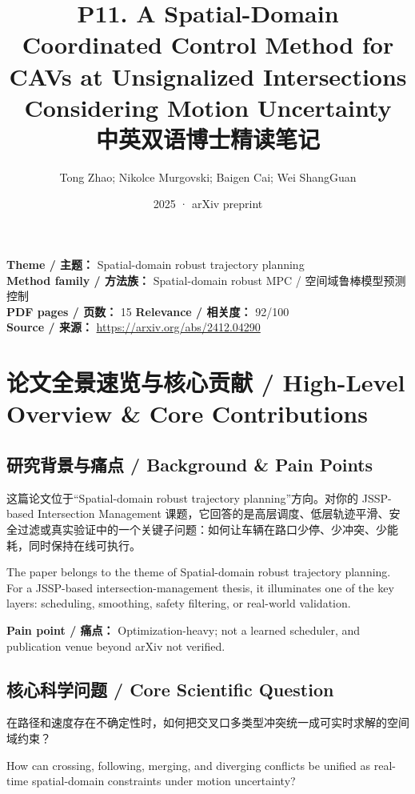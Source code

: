 \documentclass[UTF8,a4paper,11pt,fontset=fandol]{ctexart}
\title{P11. A Spatial-Domain Coordinated Control Method for CAVs at Unsignalized Intersections Considering Motion Uncertainty\\中英双语博士精读笔记}
\author{Tong Zhao; Nikolce Murgovski; Baigen Cai; Wei ShangGuan}
\date{2025 · arXiv preprint}
\begin{document}
\maketitle

\noindent\textbf{Theme / 主题：} Spatial-domain robust trajectory planning\\
\textbf{Method family / 方法族：} Spatial-domain robust MPC / 空间域鲁棒模型预测控制\\
\textbf{PDF pages / 页数：} 15 \quad
\textbf{Relevance / 相关度：} 92/100\\
\textbf{Source / 来源：} \url{https://arxiv.org/abs/2412.04290}

\section{论文全景速览与核心贡献 / High-Level Overview \& Core Contributions}
\subsection{研究背景与痛点 / Background \& Pain Points}
这篇论文位于“Spatial-domain robust trajectory planning”方向。对你的 JSSP-based Intersection Management 课题，它回答的是高层调度、低层轨迹平滑、安全过滤或真实验证中的一个关键子问题：如何让车辆在路口少停、少冲突、少能耗，同时保持在线可执行。

The paper belongs to the theme of Spatial-domain robust trajectory planning. For a JSSP-based intersection-management thesis, it illuminates one of the key layers: scheduling, smoothing, safety filtering, or real-world validation.

\textbf{Pain point / 痛点：} Optimization-heavy; not a learned scheduler, and publication venue beyond arXiv not verified.

\subsection{核心科学问题 / Core Scientific Question}
在路径和速度存在不确定性时，如何把交叉口多类型冲突统一成可实时求解的空间域约束？

How can crossing, following, merging, and diverging conflicts be unified as real-time spatial-domain constraints under motion uncertainty?
\end{document}
